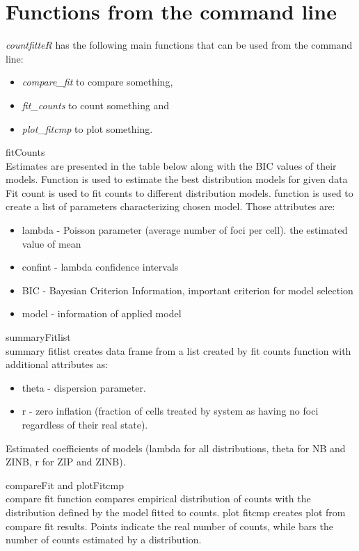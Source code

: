 \section{Functions from the command line}

\emph{countfitteR} has the following main functions that can
be used from the command line:

\begin{itemize}
    \item \textit{compare\_fit} to compare something,
    \item \textit{fit\_counts} to count something and
    \item \textit{plot\_fitcmp} to plot something.
\end{itemize}

fitCounts \\
Estimates are presented in the table below along with the BIC values of their models.
Function is used to estimate the best distribution models for given data
Fit count is used to fit counts to different distribution models.
function is used to create a list of parameters characterizing chosen model. Those attributes are: 
\begin{itemize}
    \item lambda - Poisson parameter (average number of foci per cell). the estimated value of mean
    \item confint - lambda confidence intervals
    \item BIC - Bayesian Criterion Information, important criterion for model selection
    \item model - information of applied model
\end{itemize}

summaryFitlist \\
summary fitlist creates data frame from a list created by fit counts function with additional attributes as:
\begin{itemize}
    \item theta - dispersion parameter.
    \item r - zero inflation (fraction of cells treated by system as having no foci regardless of their real state).
\end{itemize}
Estimated coefficients of models (lambda for all distributions, theta for NB and ZINB, r for ZIP and ZINB).

compareFit and plotFitcmp \\
compare fit function compares empirical distribution of counts with the distribution defined by the model fitted to counts. 
plot fitcmp creates plot from compare fit results. 
Points indicate the real number of counts, while bars the number of counts estimated by a distribution.



